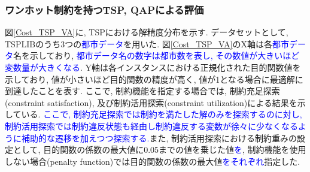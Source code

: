 \documentclass[submit,techrep,noauthor]{ipsj}
\begin{document}



\subsubsection{ワンホット制約を持つTSP, QAPによる評価}
図\ref{Cost_TSP_VA}に, TSPにおける解精度分布を示す. データセットとして, TSPLIB\cite{tsplib}のうち3つの\textcolor{blue}{都市データ}を用いた. 図\ref{Cost_TSP_VA}のX軸は各\textcolor{blue}{都市データ}名を示しており, \textcolor{blue}{都市データ名の数字は都市数を表し, その数値が大きいほど変数量が大きくなる}. Y軸は各インスタンスにおける正規化された目的関数値を示しており, 値が小さいほど目的関数の精度が高く, 値が1となる場合に最適解に到達したことを表す. ここで, 制約機能を指定する場合では, 制約充足探索(constraint satisfaction), 及び制約活用探索(constraint utilization)による結果を示している. \textcolor{blue}{ここで, 制約充足探索では制約を満たした解のみを探索するのに対し, 制約活用探索では制約違反状態も経由し制約違反する変数が徐々に少なくなるように補助的な遷移を加えつつ探索する.}また, 制約活用探索における制約重みの設定として, 目的関数の係数の最大値に0.05までの値を乗じた値\textcolor{blue}{を}, 制約機能を使用しない場合(penalty function)では目的関数の係数の最大値\textcolor{blue}{をそれぞれ}指定した.
\end{document}
